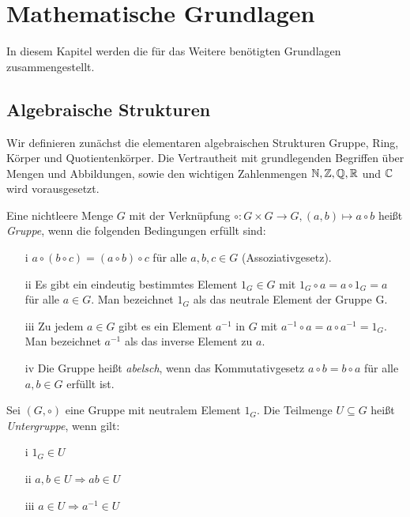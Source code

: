 \chapter{Mathematische Grundlagen}
In diesem Kapitel werden die für das Weitere benötigten Grundlagen zusammengestellt. 
\section{Algebraische Strukturen}
Wir definieren zunächst die elementaren algebraischen Strukturen Gruppe, Ring, Körper und Quotientenkörper. Die Vertrautheit mit grundlegenden Begriffen über Mengen und Abbildungen, sowie den wichtigen Zahlenmengen $\mathbb{N}, \mathbb{Z}, \mathbb{Q}, \mathbb{R}$ und $\mathbb{C}$ wird vorausgesetzt. 
%
\begin{defn}\label{Gruppe}
Eine nichtleere Menge $G$ mit der Verknüpfung $\circ \colon G \times G \rightarrow G, \left( a, b\right) \mapsto a \circ b$ heißt \textit{Gruppe}, wenn die folgenden Bedingungen erfüllt sind:
\begin{enumerate}
\item[i] $a\circ \left(b\circ c\right) = \left(a\circ b\right) \circ c$ für alle $a, b, c \in G$ (Assoziativgesetz).
\item[ii] Es gibt ein eindeutig bestimmtes Element $1_G \in G$ mit $1_G \circ a  = a \circ 1_G = a$ für alle $a \in G$. Man bezeichnet $1_G$ als das neutrale Element der Gruppe G.
\item[iii] Zu jedem $a \in G$ gibt es ein Element $a^{-1}$ in $G$ mit $a^{-1} \circ a = a \circ a^{-1} = 1_G$. Man bezeichnet $a^{-1}$ als das inverse Element zu $a$.
\item[iv] Die Gruppe heißt \textit{abelsch}, wenn das Kommutativgesetz $a \circ b = b \circ a$ für alle $a, b \in G$ erfüllt ist.  
\end{enumerate} 
\end{defn}
\begin{defn}\label{Untergruppe}
Sei $\left(G, \circ\right)$ eine Gruppe mit neutralem Element $1_G$. Die Teilmenge $U\subseteq G$ heißt \textit{Untergruppe}, wenn gilt:
\begin{enumerate}
\item[i] $1_G \in U$
\item[ii] $a, b \in U \Rightarrow ab \in U$
\item[iii] $a \in U \Rightarrow a^{-1} \in U$ 
\end{enumerate} 
\end{defn}

